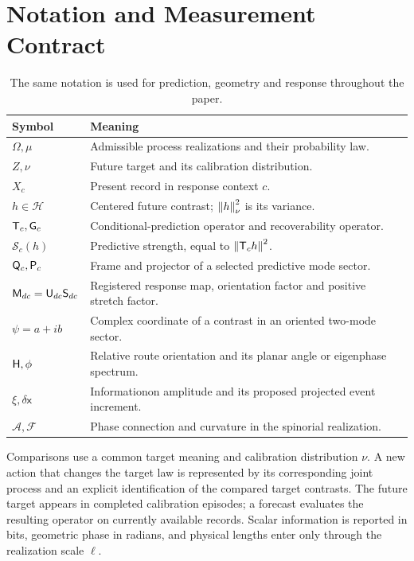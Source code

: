 \section{Notation and Measurement Contract}
\label{app:notation}
\begin{table}[H]
\centering
\caption{The same notation is used for prediction, geometry and response throughout the paper.}
\begin{tabular}{p{}p{}}
\toprule
Symbol & Meaning\\
\midrule
\(\Omega,\mu\) & Admissible process realizations and their probability law.\\
\(Z,\nu\) & Future target and its calibration distribution.\\
\(X_c\) & Present record in response context \(c\).\\
\(h\in\mathcal H\) & Centered future contrast; \(\left\lVert h\right\rVert^2_\nu\) is its variance.\\
\(\mathsf T_c,\mathsf G_c\) & Conditional-prediction operator and recoverability operator.\\
\(\mathcal S_c(h)\) & Predictive strength, equal to \(\left\lVert\mathsf T_ch\right\rVert^2\).\\
\(\mathsf Q_c,\mathsf P_c\) & Frame and projector of a selected predictive mode sector.\\
\(\mathsf M_{dc}=\mathsf U_{dc}\mathsf S_{dc}\) & Registered response map, orientation factor and positive stretch factor.\\
\(\psi=a+ib\) & Complex coordinate of a contrast in an oriented two-mode sector.\\
\(\mathsf H,\phi\) & Relative route orientation and its planar angle or eigenphase spectrum.\\
\(\xi,\delta\mathsf x\) & Informationon amplitude and its proposed projected event increment.\\
\(\mathcal A,\mathcal F\) & Phase connection and curvature in the spinorial realization.\\
\bottomrule
\end{tabular}
\end{table}
Comparisons use a common target meaning and calibration distribution \(\nu\). A new action that changes the target law is represented by its corresponding joint process and an explicit identification of the compared target contrasts. The future target appears in completed calibration episodes; a forecast evaluates the resulting operator on currently available records. Scalar information is reported in bits, geometric phase in radians, and physical lengths enter only through the realization scale \(\ell\).

